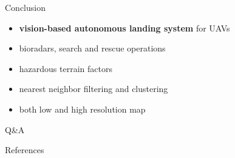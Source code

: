 \documentclass[10pt]{beamer}
\begin{document}
    \begin{frame}{Conclusion}
        \begin{itemize}
            \item \textbf{vision-based autonomous landing system} for UAVs
            \item bioradars, search and rescue operations
            \item hazardous terrain factors
            \item nearest neighbor filtering and clustering
            \item both low and high resolution map
        \end{itemize}
    \end{frame}

    \begin{frame}[standout]
        Q\&A
    \end{frame}

    \appendix

    \begin{frame}{References}
        
        
    \end{frame}
\end{document}

